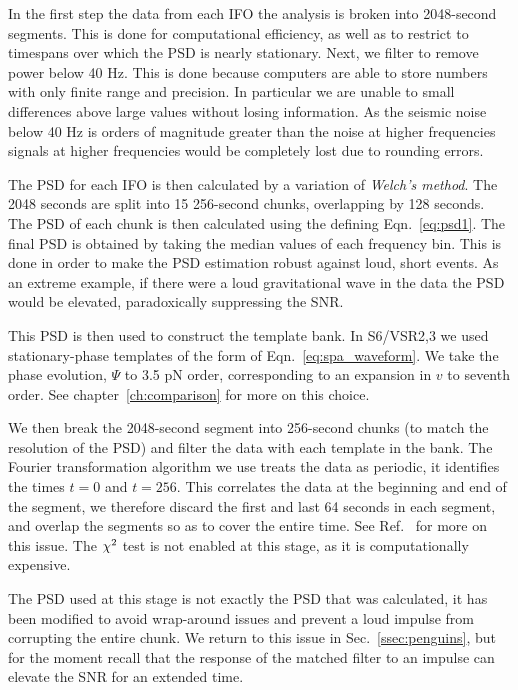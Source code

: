 In the first step the data from each IFO the analysis is broken into
2048-second segments.  This is done for computational efficiency, as
well as to restrict to timespans over which the PSD is nearly
stationary.  Next, we filter to remove power below 40 Hz.  This is
done because computers are able to store numbers with only finite
range and precision.  In particular we are unable to small differences
above large values without losing information.  As the seismic noise
below 40 Hz is orders of magnitude greater than the noise at higher
frequencies signals at higher frequencies would be completely lost due
to rounding errors.

The PSD for each IFO is then calculated by a variation of
\emph{Welch's method}.  The 2048 seconds are split into 15 256-second
chunks, overlapping by 128 seconds.  The PSD of each chunk is then
calculated using the defining Eqn.~\ref{eq:psd1}.  The final PSD
is obtained by taking the median values of each frequency bin. This is
done in order to make the PSD estimation robust against loud, short
events.  As an extreme example, if there were a loud gravitational
wave in the data the PSD would be elevated, paradoxically suppressing
the SNR. 

This PSD is then used to construct the template bank.  In S6/VSR2,3 we
used stationary-phase templates of the form of
Eqn.~\ref{eq:spa_waveform}.   We take the phase evolution, $\Psi$
to 3.5 pN order, corresponding to an expansion in $v$ to seventh
order.   See chapter~\ref{ch:comparison} for more on this choice.

We then break the 2048-second segment into 256-second chunks (to match
the resolution of the PSD) and filter the data with each template in
the bank.  The Fourier transformation algorithm we use treats the data
as periodic, it identifies the times $t=0$ and $t=256$.  This
correlates the data at the beginning and end of the segment, we
therefore discard the first and last 64 seconds in each segment, and
overlap the segments so as to cover the entire time.  See
Ref.~\cite{DBrownThesis} for more on this issue.  The $\chi^2$ test is
not enabled at this stage, as it is computationally expensive.  

The PSD used at this stage is not exactly the PSD that was calculated,
it has been modified to avoid wrap-around issues and prevent a loud
impulse from corrupting the entire chunk.  We return to this issue in
Sec.~\ref{ssec:penguins}, but for the moment recall that the
response of the matched filter to an impulse can elevate the SNR for
an extended time.

